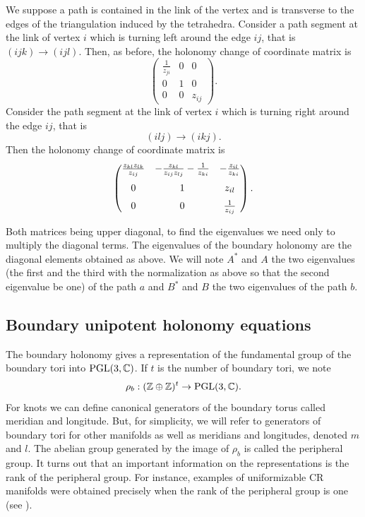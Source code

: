  We suppose a path is contained in the link of the vertex and is transverse to the edges of the triangulation induced by the tetrahedra.
Consider a path segment  at the link of vertex $i$ which is turning left around the edge $ij$, that is $(ijk)\to (ijl).$ Then, as before, the holonomy change of coordinate matrix is
$$
\left(
\begin{matrix}
\frac{1}{z_{ji}}& 0 & 0\\
0 & 1 & 0 \\
0 & 0 & z_{ij}
\end{matrix} \right).
$$
Consider the path segment at the link of vertex $i$ which is turning right around the edge $ij$, that is $$(ilj)\to (ikj).$$ Then the holonomy change of coordinate matrix is
$$
  \begin {pmatrix}
  \frac {z_{kl}z_{lk}}{z_{ij}}&
  -\frac{z_{kl}}{z_{ij}z_{lj}} - \frac{1}{z_{ki}}
&-
\frac {z_{il}}{z_{ki}}\\ \noalign{\medskip}0
&1&z_{il}\\ \noalign{\medskip}0&0&\frac{1}{z_{ij}}
\end {pmatrix}.
$$

 Both matrices being upper diagonal, to find the eigenvalues we need only to multiply the diagonal terms. The eigenvalues of the boundary holonomy are
 the diagonal elements obtained as above.  We will note $A^*$ and $A$ the two eigenvalues (the first and the third with the normalization as above so that the second eigenvalue be one) of the path $a$ and   $B^*$ and $B$ the two eigenvalues of the path $b$.

\subsection{Boundary unipotent holonomy equations}\label{sec:buh}
The boundary holonomy gives a representation of the fundamental group of the boundary tori into $\textrm{PGL}(3,\mathbb{C})$.  If $t$ is the number of boundary tori, we note
$$
 \rho_b : (\mathbb{Z}\oplus \mathbb{Z})^t \rightarrow \textrm{PGL}(3,\mathbb{C}).
$$
For knots we can define canonical generators of the boundary torus called meridian and longitude.  But, for simplicity, we will refer
to generators of boundary tori for other manifolds as well as meridians and longitudes, denoted $m$ and $l$.
The abelian group generated by the image of $\rho_b$ is called the peripheral group.
It turns out that an important information on  the representations is the rank of the peripheral group.  For instance, examples
of uniformizable CR manifolds were obtained precisely when the rank of the peripheral group is one (see \cite{Schwartz,DF,PW}).


